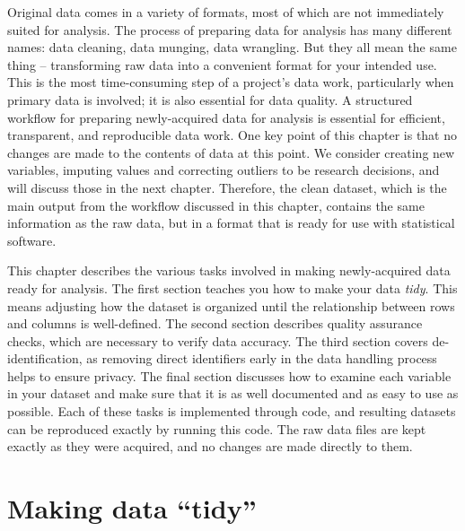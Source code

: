 
\begin{fullwidth}

Original data comes in a variety of formats,
most of which are not immediately suited for analysis.
The process of preparing data for analysis has many different names:
data cleaning, data munging, data wrangling.
But they all mean the same thing --
transforming raw data into a convenient format for your intended use.
This is the most time-consuming step of a project's data work,
particularly when primary data is involved;
it is also essential for data quality.
A structured workflow for preparing newly-acquired data for analysis
is essential for efficient, transparent, and reproducible data work.
One key point of this chapter is that no changes are made to the contents of data at this point.
We consider creating new variables, imputing values and correcting outliers
to be research decisions, and will discuss those in the next chapter.
Therefore, the clean dataset,
which is the main output from the workflow discussed in this chapter,
contains the same information as the raw data,
but in a format that is ready for use with statistical software.

This chapter describes the various tasks involved in making newly-acquired data ready for analysis.
The first section teaches you how to make your data \textit{tidy}.
This means adjusting how the dataset is organized
until the relationship between rows and columns is well-defined.
The second section describes quality assurance checks,
which are necessary to verify data accuracy.
The third section covers de-identification,
as removing direct identifiers early in the data handling process helps to ensure privacy.
The final section discusses how to examine each variable in your dataset and
make sure that it is as well documented and as easy to use as possible.
Each of these tasks is implemented through code,
and resulting datasets can be reproduced exactly by running this code.
The raw data files are kept exactly as they were acquired,
and no changes are made directly to them.

\end{fullwidth}



\section{Making data ``tidy''}

